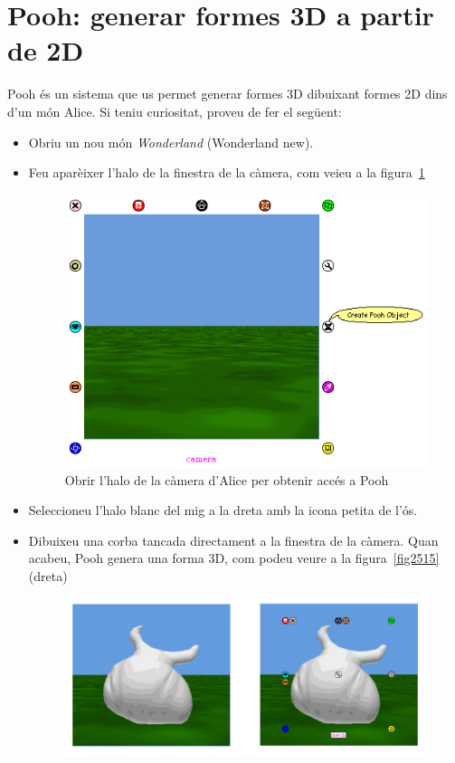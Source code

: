 \section{Pooh: generar formes 3D a partir de 2D}
Pooh és un sistema que us permet generar formes 3D dibuixant formes 2D dins d'un món Alice. Si teniu curiositat, proveu de fer el següent:
\begin{itemize}
\item Obriu un nou món \emph{Wonderland} (\textsf{Wonderland new}).
\item Feu aparèixer l'halo de la finestra de la càmera, com veieu a la figura~\ref{fig2514}
\begin{figure}[h!]
\begin{center}
\includegraphics[scale=0.5]{Imatges/figura25-14}
\end{center}
\caption{Obrir l'halo de la càmera d'Alice per obtenir accés a Pooh}
\label{fig2514}
\end{figure}
\item Seleccioneu l'halo blanc del mig a la dreta amb la icona petita de l'ós.
\item Dibuixeu una corba tancada directament a la finestra de la càmera. Quan acabeu, Pooh genera una forma 3D, com podeu veure a la figura~\ref{fig2515} (dreta)
\begin{figure}[h!]
\begin{center}
\includegraphics[scale=1.25]{Imatges/figura25-15}

\end{center}
\end{figure}
\end{itemize}
